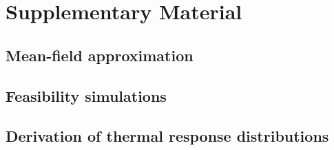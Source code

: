 \documentclass{article}
\begin{document}
\section{Supplementary Material}

\subsection{Mean-field approximation} \label{SI_Sec:Meanfield}

\subsection{Feasibility simulations} \label{SI_Sec:Feas_sims}

\subsection{Derivation of thermal response distributions} \label{SI_Sec:TPC_dist}
\end{document}
